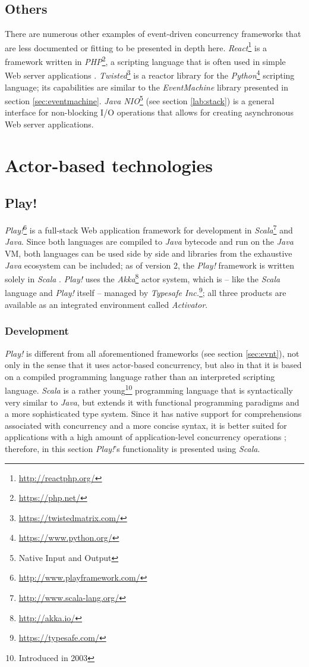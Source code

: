 \subsection{Others}
There are numerous other examples of event-driven concurrency frameworks that are less documented or fitting to be presented in depth here. \textit{React}\footnote{\url{http://reactphp.org/}} is a framework written in \textit{PHP}\footnote{\url{https://php.net/}}, a scripting language that is often used in simple Web server applications \cite[p. 36]{Erb2012}. \textit{Twisted}\footnote{\url{https://twistedmatrix.com/}} is a reactor library for the \textit{Python}\footnote{\url{https://www.python.org/}} scripting language; its capabilities are similar to the \textit{EventMachine} library presented in section \ref{sec:eventmachine}. \textit{Java NIO}\footnote{Native Input and Output} (see section \ref{lab:stack}) is a general interface for non-blocking I/O operations that allows for creating asynchronous Web server applications.

\section{Actor-based technologies}

\subsection{Play!}
\textit{Play!}\footnote{\url{http://www.playframework.com/}} is a full-stack Web application framework for development in \textit{Scala}\footnote{\url{http://www.scala-lang.org/}} and \textit{Java}. Since both languages are compiled to \textit{Java} bytecode and run on the \textit{Java} VM, both languages can be used side by side and libraries from the exhaustive \textit{Java} ecosystem can be included; as of version 2, the \textit{Play!} framework is written solely in \textit{Scala} \cite{Scala}. \textit{Play!} uses the \textit{Akka}\footnote{\url{http://akka.io/}} actor system, which is -- like the \textit{Scala} language and \textit{Play!} itself -- managed by \textit{Typesafe Inc.}\footnote{\url{https://typesafe.com/}}; all three products are available as an integrated environment called \textit{Activator}. 

\subsubsection*{Development}
\textit{Play!} is different from all aforementioned frameworks (see section \ref{sec:evnt}), not only in the sense that it uses actor-based concurrency, but also in that it is based on a compiled programming language rather than an interpreted scripting language. \textit{Scala} is a rather young\footnote{Introduced in 2003} programming language that is syntactically very similar to \textit{Java}, but extends it with functional programming paradigms and a more sophisticated type system. Since it has native support for comprehensions associated with concurrency and a more concise syntax, it is better suited for applications with a high amount of application-level concurrency operations \cite[p. 9]{Scala}; therefore, in this section \textit{Play!}'s functionality is presented using \textit{Scala}.

